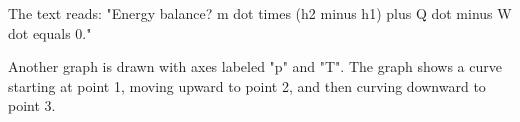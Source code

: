The text reads:  
"Energy balance?  
m dot times (h2 minus h1) plus Q dot minus W dot equals 0."  

Another graph is drawn with axes labeled "p" and "T". The graph shows a curve starting at point 1, moving upward to point 2, and then curving downward to point 3.